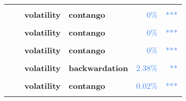 \documentclass[
  authoryear,
  preprint,
  3p]{elsarticle}
\begin{document}
\begin{longtable}[t]{>{}l>{}l>{}l>{}l>{}r>{}r}
\textbf{\cellcolor{gray!10}{}} & \textbf{\cellcolor{gray!10}{crisis}} & \textbf{\cellcolor{gray!10}{mean}} & \textbf{\cellcolor{gray!10}{contango}} & \textcolor[HTML]{4285f4}{\cellcolor{gray!10}{60.22\%}} & \textcolor[HTML]{4285f4}{\cellcolor{gray!10}{}}\\
\addlinespace
\textbf{} & \textbf{} & \textbf{volatility} & \textbf{contango} & \textcolor[HTML]{4285f4}{0\%} & \textcolor[HTML]{4285f4}{\vphantom{14} ***}\\
\textbf{\cellcolor{gray!10}{}} & \textbf{\cellcolor{gray!10}{post-crisis}} & \textbf{\cellcolor{gray!10}{mean}} & \textbf{\cellcolor{gray!10}{backwardation}} & \textcolor[HTML]{4285f4}{\cellcolor{gray!10}{56.58\%}} & \textcolor[HTML]{4285f4}{\cellcolor{gray!10}{}}\\
\textbf{} & \textbf{} & \textbf{volatility} & \textbf{contango} & \textcolor[HTML]{4285f4}{0\%} & \textcolor[HTML]{4285f4}{\vphantom{13} ***}\\
\textbf{\cellcolor{gray!10}{Palladium (XNYM)}} & \textbf{\cellcolor{gray!10}{past}} & \textbf{\cellcolor{gray!10}{mean}} & \textbf{\cellcolor{gray!10}{backwardation}} & \textcolor[HTML]{4285f4}{\cellcolor{gray!10}{0.77\%}} & \textcolor[HTML]{4285f4}{\cellcolor{gray!10}{***}}\\
\textbf{} & \textbf{} & \textbf{volatility} & \textbf{contango} & \textcolor[HTML]{4285f4}{0\%} & \textcolor[HTML]{4285f4}{\vphantom{12} ***}\\
\addlinespace
\textbf{\cellcolor{gray!10}{}} & \textbf{\cellcolor{gray!10}{financialisation}} & \textbf{\cellcolor{gray!10}{mean}} & \textbf{\cellcolor{gray!10}{backwardation}} & \textcolor[HTML]{4285f4}{\cellcolor{gray!10}{30.26\%}} & \textcolor[HTML]{4285f4}{\cellcolor{gray!10}{}}\\
\textbf{} & \textbf{} & \textbf{volatility} & \textbf{backwardation} & \textcolor[HTML]{4285f4}{2.38\%} & \textcolor[HTML]{4285f4}{**}\\
\textbf{\cellcolor{gray!10}{}} & \textbf{\cellcolor{gray!10}{crisis}} & \textbf{\cellcolor{gray!10}{mean}} & \textbf{\cellcolor{gray!10}{contango}} & \textcolor[HTML]{4285f4}{\cellcolor{gray!10}{96.05\%}} & \textcolor[HTML]{4285f4}{\cellcolor{gray!10}{}}\\
\textbf{} & \textbf{} & \textbf{volatility} & \textbf{contango} & \textcolor[HTML]{4285f4}{0.02\%} & \textcolor[HTML]{4285f4}{\vphantom{1} ***}\\
\textbf{\cellcolor{gray!10}{}} & \textbf{\cellcolor{gray!10}{post-crisis}} & \textbf{\cellcolor{gray!10}{mean}} & \textbf{\cellcolor{gray!10}{backwardation}} & \textcolor[HTML]{4285f4}{\cellcolor{gray!10}{9.4\%}} & \textcolor[HTML]{4285f4}{\cellcolor{gray!10}{*}}\\

\end{longtable}
\end{document}
